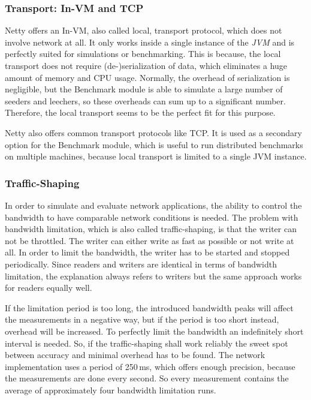 \subsubsection{Transport: In-VM and TCP}
\label{module:core:net:transport}
Netty offers an In-VM, also called local, transport protocol, which does not involve network at all. It only works inside a single instance of the \emph{JVM} and is perfectly suited for simulations or benchmarking. This is because, the local transport does not require (de-)serialization of data, which eliminates a huge amount of memory and CPU usage. Normally, the overhead of serialization is negligible, but the Benchmark module is able to simulate a large number of seeders and leechers, so these overheads can sum up to a significant number. Therefore, the local transport seems to be the perfect fit for this purpose.

Netty also offers common transport protocols like TCP. It is used as a secondary option for the Benchmark module, which is useful to run distributed benchmarks on multiple machines, because local transport is limited to a single JVM instance.


\subsubsection{Traffic-Shaping}
In order to simulate and evaluate network applications, the ability to control the bandwidth to have comparable network conditions is needed. The problem with bandwidth limitation, which is also called traffic-shaping, is that the writer can not be throttled. The writer can either write as fast as possible or not write at all. In order to limit the bandwidth, the writer has to be started and stopped periodically. Since readers and writers are identical in terms of bandwidth limitation, the explanation always refers to writers but the same approach works for readers equally well.

If the limitation period is too long, the introduced bandwidth peaks will affect the measurements in a negative way, but if the period is too short instead, overhead will be increased. To perfectly limit the bandwidth an indefinitely short interval is needed. So, if the traffic-shaping shall work reliably the sweet spot between accuracy and minimal overhead has to be found. The network implementation uses a period of 250\,ms, which offers enough precision, because the measurements are done every second. So every measurement contains the average of approximately four bandwidth limitation runs.

